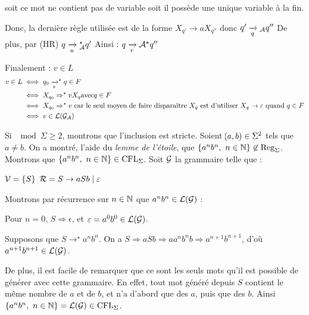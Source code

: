 \documentclass[a4paper,french,bookmarks]{book}
\DeclareMathOperator{\Reg}{Reg}
\begin{document}
\begin{nproof}
\begin{enumerate}
            \begin{enumerate}
                \itt soit ce mot ne contient pas de variable
                \itt soit il possède une unique variable à la fin.
            \end{enumerate}
            Donc, la dernière règle utilisée est de la forme $X_{q'} \to aX_{q''}$ donc $q' \lima{q}{}_\bcA q'' $
            De plus, par (HR) $q \lima{u}{}_\bcA^\star q'$ Ainsi : $q \lima{v}{}\bcA^\star q''$
        \end{enumerate}
        Finalement :
        $v \in L$
        \begin{align*}
            v \in L &\iff q_0 \lima{v}^\star q \in F\\
            &\iff X_{q_0} \Rightarrow^\star v X_q \text{avec} q \in F\\
            &\iff X_{q_0} \Rightarrow^\star v \ \text{car le seul moyen de faire disparaître} \ X_q \ \text{est d'utiliser} \ X_q \to \epsilon \ \text{quand} \ q \in F\\
            &\iff v \in \bcL\p{\bcG_\bcA}
        \end{align*}
        
        Si $\mod{\Sigma} \geq 2$, montrons que l'inclusion est stricte. Soient $\!\left(a, b\right) \in \Sigma^2$ tels que $a \neq b$. On a montré, l'aide du \emph{lemme de l'étoile}, que $\ens{a^nb^n,\ n \in \bdN} \not\in \Reg_\Sigma$. Montrons que $\ens{a^nb^n,\ n \in \bdN} \in \CFL_\Sigma$. Soit $\mathcal{G}$ la grammaire telle que :
        \begin{enumerate}
            \itt $\mathcal{V} = \left\{S\right\}$
            \itt $\mathcal{R} = S \rightarrow aSb \mid \varepsilon$
        \end{enumerate}
        Montrons par récurrence sur $n \in \mathbb{N}$ que $a^nb^n \in \mathcal{L}\!\left(\mathcal{G}\right)$ :
        \begin{enumerate}
            \itt Pour $n = 0$, $S \Rightarrow \epsilon$, et $\varepsilon = a^0b^0 \in \mathcal{L}\!\left(\mathcal{G}\right)$.
            
            \itt Supposons que $S \rightarrow^\star a^nb^n$. On a $S \Rightarrow aSb \Rightarrow aa^nb^nb \Rightarrow a^{n+1}b^{n+1}$, d'où $a^{n+1}b^{n+1} \in \mathcal{L}\!\left(\mathcal{G}\right)$.
        \end{enumerate}
        De plus, il est facile de remarquer que ce sont les seuls mots qu'il est possible de générer avec cette grammaire. En effet, tout mot généré depuis $S$ contient le même nombre de $a$ et de $b$, et n'a d'abord que des $a$, puis que des $b$. Ainsi $\ens{a^nb^n,\ n \in \bdN} = \bcL\p{\bcG} \in \CFL_\Sigma$.
    \end{nproof}
    
\end{document}
